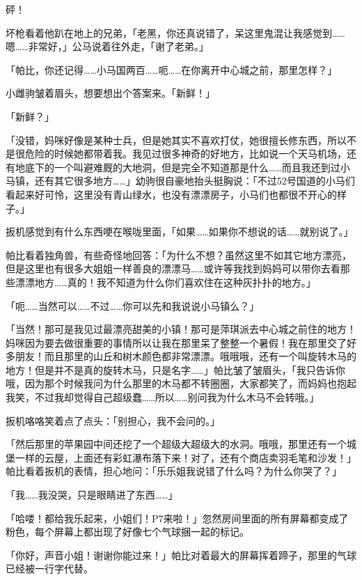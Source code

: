 砰！

坏枪看着他趴在地上的兄弟，「老黑，你还真说错了，呆这里鬼混让我感觉到……嗯……非常好，」公马说着往外走，「谢了老弟。」

\horizonline


「帕比，你还记得……小马国两百……呃……在你离开中心城之前，那里怎样？」

小雌驹皱着眉头，想要想出个答案来。「新鲜！」

「新鲜？」

「没错，妈咪好像是某种士兵，但是她其实不喜欢打仗，她很擅长修东西，所以不是很危险的时候她都带着我。我见过很多神奇的好地方，比如说一个天马机场，还有地底下的一个叫避难厩的大地洞，但是完全不知道那是什么……而且我还到过小马镇，还有其它很多地方……」幼驹很自豪地抬头挺胸说：「不过52号国道的小马们看起来好可怜，这里没有青山绿水，也没有漂漂房子，小马们也都很不开心的样子。」

扳机感觉到有什么东西哽在喉咙里面，「如果……如果你不想说的话……就别说了。」

帕比看着独角兽，有些奇怪地回答：「为什么不想？虽然这里不如其它地方漂亮，但是这里也有很多大姐姐一样善良的漂漂马……或许等我找到妈妈可以带你去看那些漂漂地方……真的！我不知道为什么你们喜欢住在这种灰扑扑的地方。」

「呃……当然可以……不过……你可以先和我说说小马镇么？」

「当然！那可是我见过最漂亮甜美的小镇！那可是萍琪派去中心城之前住的地方！妈咪因为要去做很重要的事情所以让我在那里呆了整整一个暑假！我在那里交了好多朋友！而且那里的山丘和树木颜色都非常漂漂。哦哦哦，还有一个叫旋转木马的地方！但是并不是真的旋转木马，只是名字……」帕比皱了皱眉头，「我只告诉你哦，因为那个时候我问为什么那里的木马都不转圈圈，大家都笑了，而妈妈也抱起我笑，不过我却觉得自己超级蠢……所以……别问我为什么木马不会转哦。」

扳机咯咯笑着点了点头：「别担心，我不会问的。」

「然后那里的苹果园中间还挖了一个超级大超级大的水洞。哦哦，那里还有一个城堡一样的云屋，上面还有彩虹瀑布落下来！对了，还有个商店卖羽毛笔和沙发！」帕比看着扳机的表情，担心地问：「乐乐姐我说错了什么吗？为什么你哭了？」

「我……我没哭，只是眼睛进了东西……」

「哈喽！都给我乐起来，小姐们！P7来啦！」忽然房间里面的所有屏幕都变成了粉色，每个屏幕上都出现了好像七个气球捆一起的标记。

「你好，声音小姐！谢谢你能过来！」帕比对着最大的屏幕挥着蹄子，那里的气球已经被一行字代替。


